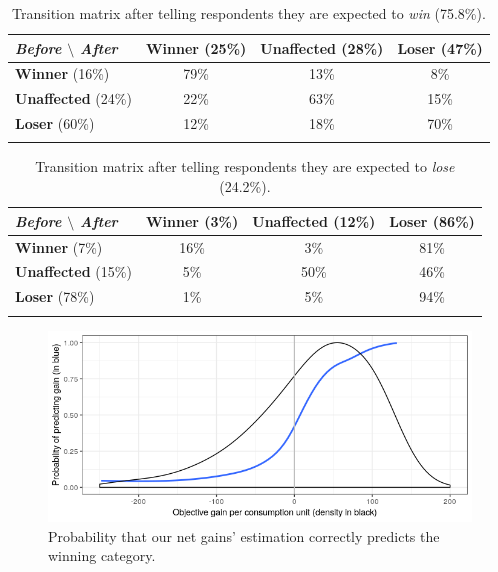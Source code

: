 \documentclass[12pt]{article} %
\begin{document}
\begin{appendices}
\begin{table}[H]
\caption[table]{Transition matrix after telling respondents they are expected to \textit{win} (75.8\%).}
{\label{table:transition_matrix_positive_feedback}}
\centering
\begin{tabular}{lccc}
\textit{Before $\setminus$ After} & \textbf{Winner} (25\%) & \textbf{Unaffected} (28\%) & \textbf{Loser} (47\%) \\
\hline
\textbf{Winner} (16\%) & 79\% & 13\% & 8\%\\
\textbf{Unaffected} (24\%) & 22\% & 63\% & 15\% \\
\textbf{Loser} (60\%) & 12\% & 18\% & 70\% \\ \\
\end{tabular}
\end{table}

\vspace{1cm}

\begin{table}[H]
\caption[table]{Transition matrix after telling respondents they are expected to \textit{lose} (24.2\%).}
{\label{table:transition_matrix_negative_feedback}}
\centering
\begin{tabular}{lccc}
\textit{Before $\setminus$ After} & \textbf{Winner} (3\%) & \textbf{Unaffected} (12\%) & \textbf{Loser} (86\%) \\
\hline
\textbf{Winner} (7\%) & 16\% & 3\% & 81\% \\
\textbf{Unaffected} (15\%) & 5\% & 50\% & 46\% \\
\textbf{Loser} (78\%) & 1\% & 5\% & 94\% \\ \\
\end{tabular}
\end{table}

\vspace{1.5cm}


\begin{figure}[H]
\centering
\includegraphics[width=0.8\columnwidth]{Images/proba_correct_prediction.png}
\caption{Probability that our net gains' estimation correctly predicts the winning category.}
\label{fig:proba_pred}
\end{figure}


\end{appendices}
\end{document}
